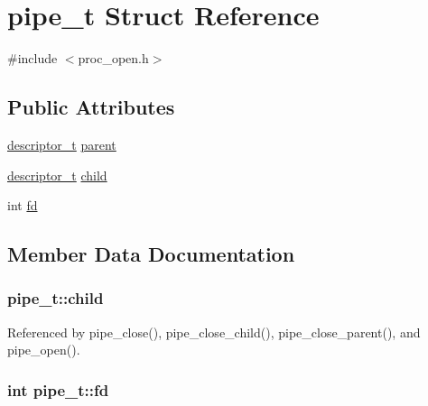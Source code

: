 \hypertarget{structpipe__t}{\section{pipe\-\_\-t Struct Reference}
\label{structpipe__t}
}


{\ttfamily \#include $<$proc\-\_\-open.\-h$>$}

\subsection*{Public Attributes}
\begin{DoxyCompactItemize}
\item 
\hyperlink{proc__open_8h_a9d147b306339b4fb3336d484b866bd80}{descriptor\-\_\-t} \hyperlink{structpipe__t_a5d4dc41ce76c8eaabe7120791af29a20}{parent}
\item 
\hyperlink{proc__open_8h_a9d147b306339b4fb3336d484b866bd80}{descriptor\-\_\-t} \hyperlink{structpipe__t_a9bb59bfb37bcfe5f0a075153d8225c0f}{child}
\item 
int \hyperlink{structpipe__t_a1805b07608c6f2a5ea391e7b4460bacc}{fd}
\end{DoxyCompactItemize}


\subsection{Member Data Documentation}
\hypertarget{structpipe__t_a9bb59bfb37bcfe5f0a075153d8225c0f}{
\subsubsection[{child}]{ pipe\-\_\-t\-::child}}\label{structpipe__t_a9bb59bfb37bcfe5f0a075153d8225c0f}


Referenced by pipe\-\_\-close(), pipe\-\_\-close\-\_\-child(), pipe\-\_\-close\-\_\-parent(), and pipe\-\_\-open().

\hypertarget{structpipe__t_a1805b07608c6f2a5ea391e7b4460bacc}{
\subsubsection[{fd}]{\setlength{\rightskip}{0pt plus 5cm}int pipe\-\_\-t\-::fd}}\label{structpipe__t_a1805b07608c6f2a5ea391e7b4460bacc}



